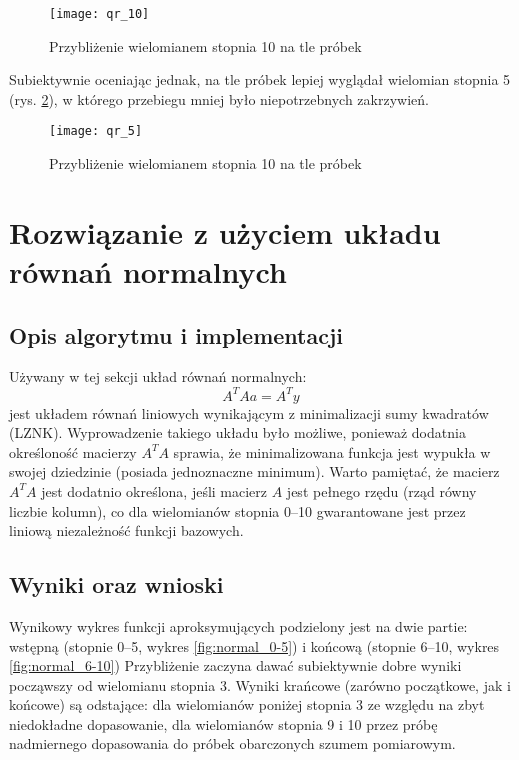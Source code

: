 \documentclass[12pt]{article}
\begin{document}
\begin{figure}[!htbp]
\centering
\texttt{[image: qr\_10]}
\centering
\caption{Przybliżenie wielomianem stopnia 10 na tle próbek}
\label{fig:qr_10}
\end{figure}
\FloatBarrier

Subiektywnie oceniając jednak, na tle próbek lepiej wyglądał wielomian stopnia 5 (rys. \ref{fig:qr_5}), w którego przebiegu mniej było niepotrzebnych zakrzywień.

\begin{figure}[!htbp]
\centering
\texttt{[image: qr\_5]}
\centering
\caption{Przybliżenie wielomianem stopnia 10 na tle próbek}
\label{fig:qr_5}
\end{figure}
\FloatBarrier

\clearpage
\section{Rozwiązanie z użyciem układu równań normalnych}

\subsection{Opis algorytmu i implementacji}
Używany w tej sekcji układ równań normalnych:
\[A^{T}Aa=A^{T}y\]
jest układem równań liniowych wynikającym z minimalizacji sumy kwadratów (LZNK). Wyprowadzenie takiego układu było możliwe, ponieważ dodatnia określoność macierzy \(A^{T}A\) sprawia, że minimalizowana funkcja jest wypukła w swojej dziedzinie (posiada jednoznaczne minimum). Warto pamiętać, że macierz \(A^{T}A\) jest dodatnio określona, jeśli macierz \(A\) jest pełnego rzędu (rząd równy liczbie kolumn), co dla wielomianów stopnia 0--10 gwarantowane jest przez liniową niezależność funkcji bazowych.

\subsection{Wyniki oraz wnioski}
Wynikowy wykres funkcji aproksymujących podzielony jest na dwie partie: wstępną (stopnie 0--5, wykres \ref{fig:normal_0-5}) i końcową (stopnie 6--10, wykres \ref{fig:normal_6-10})
Przybliżenie zaczyna dawać subiektywnie dobre wyniki począwszy od wielomianu stopnia 3. Wyniki krańcowe (zarówno początkowe, jak i końcowe) są odstające: dla wielomianów poniżej stopnia 3 ze względu na zbyt niedokładne dopasowanie, dla wielomianów stopnia 9 i 10 przez próbę nadmiernego dopasowania do próbek obarczonych szumem pomiarowym.
\end{document}
